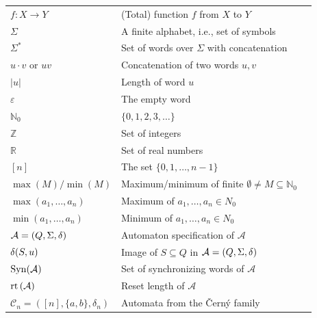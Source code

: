 \begin{longtable}{p{} p{} p{}}		
	$f \colon X \to Y$ & (Total) function $f$ from $X$ to $Y$ & \pageref{def:total_function} \\
	$\Sigma$           & A finite alphabet, i.e., set of symbols & \pageref{def:Sigma} \\
	$\Sigma^*$         & Set of words over $\Sigma$ with concatenation & \pageref{def:Sigmastar} \\
	$u\cdot v$ or $uv$ & Concatenation of two words $u,v$ & \pageref{def:Sigmastar} \\
	$|u|$              & Length of word $u$ & \pageref{def:length_of_word} \\
	$\varepsilon$      & The empty word & \pageref{def:empty-word} \\
	$\mathbb N_0$      & $\{0,1,2,3,\ldots\}$ & \pageref{def:N0} \\	
	$\mathbb Z$        & Set of integers & \pageref{def:integers} \\
	$\mathbb R$        & Set of real numbers & \pageref{def:realnumbers} \\
	$[n]$             & The set $\{ 0,1,\ldots, n- 1\}$ & \pageref{def:finite_set_n} \\
	$\max(M) / \min(M)$ & Maximum/minimum of finite $\emptyset \ne M \subseteq \mathbb N_0$ & \pageref{def:min} \\
	$\max(a_1,\ldots,a_n)$ & Maximum of $a_1,\ldots,a_n \in N_0$ & \pageref{def:min} \\
	$\min(a_1,\ldots,a_n)$ & Minimum of $a_1,\ldots,a_n \in N_0$ & \pageref{def:min} \\
	$\mathcal A = (Q, \Sigma, \delta)$ & Automaton specification of $\mathcal A$ & \pageref{def:automaton} \\
	$\delta(S,u)$ & Image of $S \subseteq Q$ in $\mathcal A = (Q, \Sigma, \delta)$ & \pageref{def:image-delta} \\
	$\operatorname{Syn}(\mathcal A)$ & Set of synchronizing words of  $\mathcal A$ & \pageref{def:set_of_sync_words} \\	
	$\operatorname{rt}{(\mathcal A)}$  & Reset length of $\mathcal A$ & \pageref{def:rt} \\
	$\mathcal C_n = ([n], \{a,b\}, \delta_n)$   & Automata from the \v{C}ern\'y family & \pageref{def:Cn} \\

\end{longtable}
